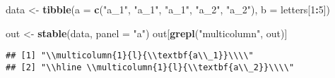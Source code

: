 \documentclass[
]{article}
\newenvironment{Shaded}{\begin{snugshade}}{\end{snugshade}}
\newcommand{\DataTypeTok}[1]{\textcolor[rgb]{0.13,0.29,0.53}{#1}}
\newcommand{\DecValTok}[1]{\textcolor[rgb]{0.00,0.00,0.81}{#1}}
\newcommand{\KeywordTok}[1]{\textcolor[rgb]{0.13,0.29,0.53}{\textbf{#1}}}
\newcommand{\NormalTok}[1]{#1}
\newcommand{\OperatorTok}[1]{\textcolor[rgb]{0.81,0.36,0.00}{\textbf{#1}}}
\newcommand{\StringTok}[1]{\textcolor[rgb]{0.31,0.60,0.02}{#1}}
\begin{document}
\begin{Shaded}
\begin{Highlighting}[]
\NormalTok{data <-}\StringTok{ }\KeywordTok{tibble}\NormalTok{(}\DataTypeTok{a =} \KeywordTok{c}\NormalTok{(}\StringTok{"a_1"}\NormalTok{, }\StringTok{"a_1"}\NormalTok{, }\StringTok{"a_1"}\NormalTok{, }\StringTok{"a_2"}\NormalTok{, }\StringTok{"a_2"}\NormalTok{), }
               \DataTypeTok{b =}\NormalTok{ letters[}\DecValTok{1}\OperatorTok{:}\DecValTok{5}\NormalTok{])}

\NormalTok{out <-}\StringTok{ }\KeywordTok{stable}\NormalTok{(data, }\DataTypeTok{panel =} \StringTok{"a"}\NormalTok{) }
\NormalTok{out[}\KeywordTok{grepl}\NormalTok{(}\StringTok{"multicolumn"}\NormalTok{, out)]}
\end{Highlighting}
\end{Shaded}

\begin{verbatim}
## [1] "\\multicolumn{1}{l}{\\textbf{a\\_1}}\\\\"        
## [2] "\\hline \\multicolumn{1}{l}{\\textbf{a\\_2}}\\\\"
\end{verbatim}
\end{document}
